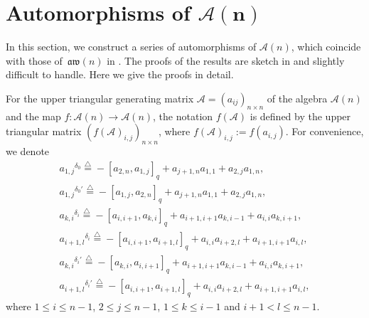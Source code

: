 \documentclass[pdftex]{sigma}
\numberwithin{equation}{section}
\def\lrb#1{\left(#1\right)}
\def\lq#1{\left[#1\right]_q}
\def\d{\delta}
\def\A{\mathscr{A}}
\def\aw{\mathfrak{aw}}
\begin{document}
\section[Automorphisms of A(n)]{Automorphisms of $\boldsymbol{\A(n)}$}\label{sect:automorphism}

In this section, we construct a series of automorphisms of $\A(n)$,
which coincide with those of~$\aw(n)$ in \cite{CFPR(2023)}.
The proofs of the results are sketch in \cite{CFPR(2023)} and slightly difficult to handle.
Here we give the proofs in detail.

For the upper triangular generating matrix $\A=(a_{ij})_{n\times n}$ of the algebra $\A(n)$ and the map $f\colon \A(n)\to \A(n)$, the notation $f\lrb{\A}$ is defined by the upper triangular matrix $(f\lrb{\A}_{i,j})_{n\times n}$, where $f\lrb{\A}_{i,j}:=f\lrb{a_{i,j}}$.
For convenience, we denote
\begin{gather}%
 {a_{1,j}}^{\d_0}\overset{\bigtriangleup}{=} -\lq{a_{2,n}, a_{1,j}}+a_{j+1,n}a_{1,1}+a_{2,j}a_{1,n}, \label{eqn:r0} \\
 {a_{1,j}}^{\d_0'}\overset{\bigtriangleup}{=} -\lq{a_{1,j}, a_{2,n}}+a_{j+1,n}a_{1,1}+a_{2,j}a_{1,n}, \\
 {a_{k,i}}^{\d_i}\overset{\bigtriangleup}{=} -\lq{a_{i,i+1}, a_{k,i}}+a_{i+1,i+1}a_{k,i-1}+a_{i,i}a_{k,i+1}, \label{eqn:ri} \\
 {a_{i+1, l}}^{\d_i}\overset{\bigtriangleup}{=} -\lq{a_{i,i+1}, a_{i+1, l}}+a_{i,i}a_{i+2,l}+a_{i+1,i+1}a_{i,l}, \label{eqn:ri+1}\\
 {a_{k,i}}^{\d_i'}\overset{\bigtriangleup}{=} -\lq{a_{k,i}, a_{i,i+1}}+a_{i+1,i+1}a_{k,i-1}+a_{i,i}a_{k,i+1}, \\
 {a_{i+1, l}}^{\d_i'}\overset{\bigtriangleup}{=} -\lq{a_{i,i+1}, a_{i+1, l}} +a_{i,i}a_{i+2,l} +a_{i+1,i+1}a_{i,l},
\end{gather}
where $1\leq i\leq n-1$, $2\leq j\leq n-1$, $1 \leq k \leq i-1$ and $i+1<l\leq n-1.$
\end{document}
